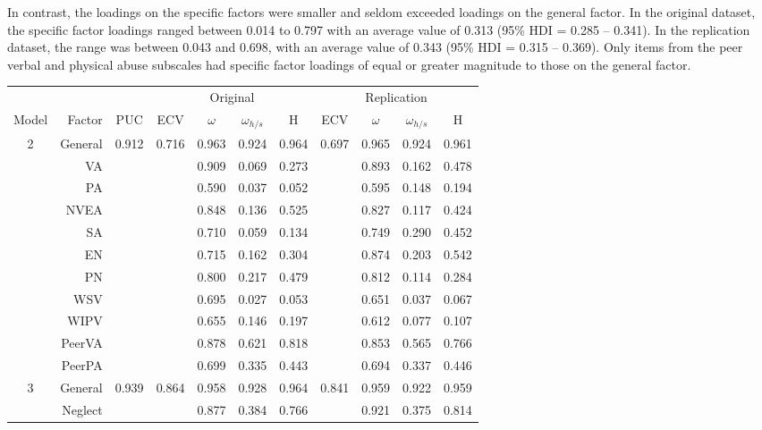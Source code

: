 \documentclass[letterpaper,man,natbib,floatsintext,longtable]{apa6}
\begin{document}
In contrast, the loadings on the specific factors were smaller and seldom exceeded loadings on the general factor. In the original dataset, the specific factor loadings ranged between 0.014 to 0.797 with an average value of 0.313 (95\% HDI = 0.285 -- 0.341). In the replication dataset, the range was between 0.043 and 0.698, with an average value of 0.343 (95\% HDI = 0.315 -- 0.369). Only items from the peer verbal and physical abuse subscales had specific factor loadings of equal or greater magnitude to those on the general factor. 
\begin{table}[t!]
\centering
\begin{tabular*}{\textwidth}{crccccccccc}
\toprule
& & & \multicolumn{4}{c}{Original} & \multicolumn{4}{c}{Replication} \\
\cmidrule(lr){4-7}\cmidrule(lr){8-11}
Model & Factor & PUC & ECV & $\omega$ & $\omega_{h/s}$ & H & ECV & $\omega$ & $\omega_{h/s}$ & H \\
\midrule
2 & General &  0.912 & 0.716 &  0.963 &   0.924 &  0.964 & 0.697 & 0.965 & 0.924 & 0.961 \\
& VA        &        &       &  0.909 &   0.069 &  0.273 &       & 0.893 & 0.162 & 0.478 \\
& PA        &        &       &  0.590 &   0.037 &  0.052 &       & 0.595 & 0.148 & 0.194 \\
& NVEA      &        &       &  0.848 &   0.136 &  0.525 &       & 0.827 & 0.117 & 0.424 \\
& SA        &        &       &  0.710 &   0.059 &  0.134 &       & 0.749 & 0.290 & 0.452 \\
& EN        &        &       &  0.715 &   0.162 &  0.304 &       & 0.874 & 0.203 & 0.542 \\
& PN        &        &       &  0.800 &   0.217 &  0.479 &       & 0.812 & 0.114 & 0.284 \\
& WSV       &        &       &  0.695 &   0.027 &  0.053 &       & 0.651 & 0.037 & 0.067 \\
& WIPV      &        &       &  0.655 &   0.146 &  0.197 &       & 0.612 & 0.077 & 0.107 \\
& PeerVA    &        &       &  0.878 &   0.621 &  0.818 &       & 0.853 & 0.565 & 0.766 \\
& PeerPA    &        &       &  0.699 &   0.335 &  0.443 &       & 0.694 & 0.337 & 0.446 \\
\midrule
3 & General &  0.939 & 0.864 &  0.958 &   0.928 &  0.964 & 0.841 & 0.959 & 0.922 & 0.959 \\
& Neglect   &        &       &  0.877 &   0.384 &  0.766 &       & 0.921 & 0.375 & 0.814 \\

\end{tabular*}
\end{table}
\end{document}
